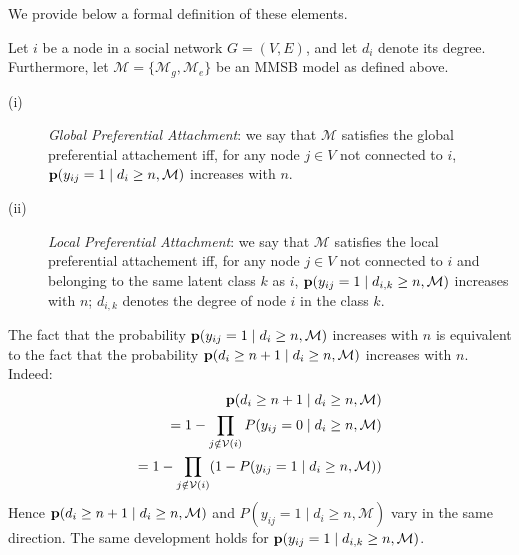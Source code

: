 We provide below a formal definition of these elements.
%
\begin{definition}
Let $i$ be a node in a social network $G=(V,E)$, and let $d_i$ denote its degree. Furthermore, let $\mathcal{M}=\{\mathcal{M}_g, \mathcal{M}_e\}$ be an MMSB model as defined above.
\begin{description}
 \item[(i)] \emph{Global Preferential Attachment}: we say that $\mathcal{M}$ satisfies the global preferential attachement iff, for any node $j \in V$ not connected to $i$, $\mathbf{p}(y_{ij}=1 \mid d_i \ge n, \mathcal{M})$ increases with $n$.
 \item[(ii)] \emph{Local Preferential Attachment}: we say that $\mathcal{M}$ satisfies the local preferential attachement iff, for any node $j \in V$ not connected to $i$ and belonging to the same latent class $k$ as $i$, $\mathbf{p}(y_{ij}=1 \mid d_{i,k} \ge n, \mathcal{M})$ increases with $n$; $d_{i,k}$ denotes the degree of node $i$ in the class $k$.
\end{description}
\label{def:burst-soc-net}
\end{definition}
%
The fact that the probability $\mathbf{p}(y_{ij}=1 \mid d_i \ge n,\mathcal{M})$ increases with $n$ is equivalent to the fact that the probability $\mathbf{p}(d_{i} \ge n+1 \mid d_i \ge n, \mathcal{M})$ increases with $n$. Indeed:
%
\begin{align}
\mathbf{p}(d_{i} \ge n+1 \mid d_i \ge n, \mathcal{M}) \nonumber \\
= 1 - \prod_{j \notin \mathcal{V}(i)} P(y_{ij} = 0 \mid d_i \ge n, \mathcal{M}) \nonumber \\
= 1 - \prod_{j \notin \mathcal{V}(i)} (1 - P(y_{ij} = 1 \mid d_i \ge n, \mathcal{M})) \nonumber
\end{align}
%
Hence $\mathbf{p}(d_{i} \ge n+1 \mid d_i \ge n, \mathcal{M})$ and $P(y_{ij} = 1 \mid d_i \ge n, \mathcal{M})$ vary in the same direction. The same development holds for $\mathbf{p}(y_{ij}=1 \mid d_{i,k} \ge n, \mathcal{M})$. %

